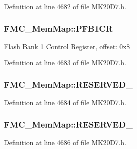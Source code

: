 Definition at line 4682 of file M\+K20\+D7.\+h.

\subsubsection[{\texorpdfstring{P\+F\+B1\+CR}{PFB1CR}}]{ F\+M\+C\+\_\+\+Mem\+Map\+::\+P\+F\+B1\+CR}\hypertarget{struct_f_m_c___mem_map_a4f1e0f3859071a0a5bbb2658d3c50008}{}\label{struct_f_m_c___mem_map_a4f1e0f3859071a0a5bbb2658d3c50008}
Flash Bank 1 Control Register, offset\+: 0x8 

Definition at line 4683 of file M\+K20\+D7.\+h.

\subsubsection[{\texorpdfstring{R\+E\+S\+E\+R\+V\+E\+D\+\_\+0}{RESERVED_0}}]{ F\+M\+C\+\_\+\+Mem\+Map\+::\+R\+E\+S\+E\+R\+V\+E\+D\+\_}\hypertarget{struct_f_m_c___mem_map_a548529dff72d32964daf52897500e275}{}\label{struct_f_m_c___mem_map_a548529dff72d32964daf52897500e275}


Definition at line 4684 of file M\+K20\+D7.\+h.

\subsubsection[{\texorpdfstring{R\+E\+S\+E\+R\+V\+E\+D\+\_\+1}{RESERVED_1}}]{ F\+M\+C\+\_\+\+Mem\+Map\+::\+R\+E\+S\+E\+R\+V\+E\+D\+\_}\hypertarget{struct_f_m_c___mem_map_ac7adf0bcbdd849e124b5d116f108f18c}{}\label{struct_f_m_c___mem_map_ac7adf0bcbdd849e124b5d116f108f18c}


Definition at line 4686 of file M\+K20\+D7.\+h.

